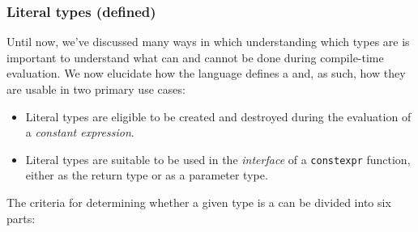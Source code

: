 \subsubsection[Literal types (defined)]{Literal types (defined)}\label{literal-types-(defined)}

Until now, we've discussed many ways in which understanding which types
are  is important to understand what can and
cannot be done during compile-time evaluation. We now elucidate how the
language defines a  and, as such, how they are
usable in two primary use cases:

\begin{itemize}
\item{Literal types are eligible to be created and destroyed during the evaluation of a \emph{constant expression}.}
\item{Literal types are suitable to be used in the \emph{interface} of a \lstinline!constexpr! function, either as the return type or as a parameter type.}
\end{itemize}

The criteria for determining whether a given type is a  can be divided into six parts:

